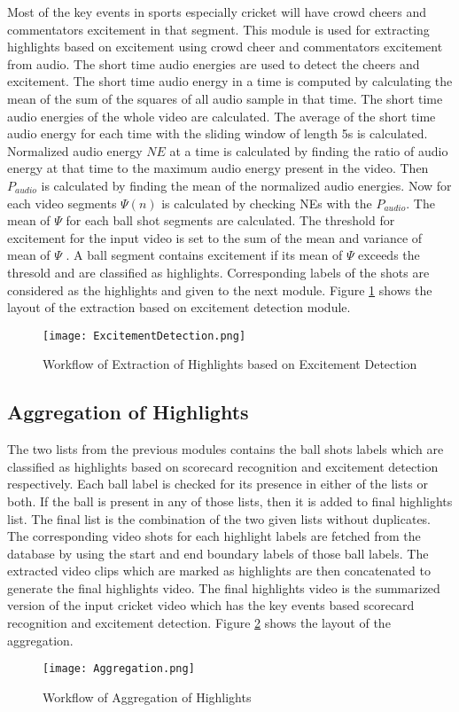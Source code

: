 Most of the key events in sports especially cricket will have crowd cheers and commentators excitement in that segment. This module is used for extracting highlights based on excitement using crowd cheer and commentators excitement from audio. The short time audio energies are used to detect the cheers and excitement. The short time audio energy in a time is computed by calculating the mean of the sum of the squares of all audio sample in that time. The short time audio energies of the whole video are calculated. The average of the short time audio energy for each time with the sliding window of length 5s is calculated. Normalized audio energy $NE$ at a time is calculated by finding the ratio of audio energy at that time to the maximum audio energy present in the video. Then $P_{audio}$ is calculated by finding the mean of the normalized audio energies. Now for each video segments $\Psi(n)$  is calculated by checking NEs with the $P_{audio}$. The mean of $\Psi$ for each ball shot segments are calculated. The threshold for excitement for the input video is set to the sum of the mean and variance of mean of $\Psi$ . A ball segment contains excitement if its mean of $\Psi$ exceeds the thresold and are classified as highlights. Corresponding labels of the shots are considered as the highlights and given to the next module.
Figure \ref{fig:Excitement} shows the layout of the extraction based on excitement detection module.

\begin{figure}[h]
    \centering
    \texttt{[image: ExcitementDetection.png]}
    \caption{Workflow of Extraction of Highlights based on Excitement Detection}
    \label{fig:Excitement}
\end{figure}

\newpage

\subsection{Aggregation of Highlights}
The two lists from the previous modules contains the ball shots labels which are classified as highlights based on scorecard recognition and excitement detection respectively. Each ball label is checked for its presence in either of the lists or both. If the ball is present in any of those lists, then it is added to final highlights list. The final list is the combination of the two given lists without duplicates. The corresponding video shots for each highlight labels are fetched from the database by using the start and end boundary labels of those ball labels. The extracted video clips which are marked as highlights are then concatenated to generate the final highlights video. The final highlights video is the summarized version of the input cricket video which has the key events based scorecard recognition and excitement detection. Figure \ref{fig:Aggregation of Highlights} shows the layout of the aggregation.
\begin{figure}[h]
    \centering
    \texttt{[image: Aggregation.png]}
    \caption{Workflow of Aggregation of Highlights}
    \label{fig:Aggregation of Highlights}
\end{figure}

